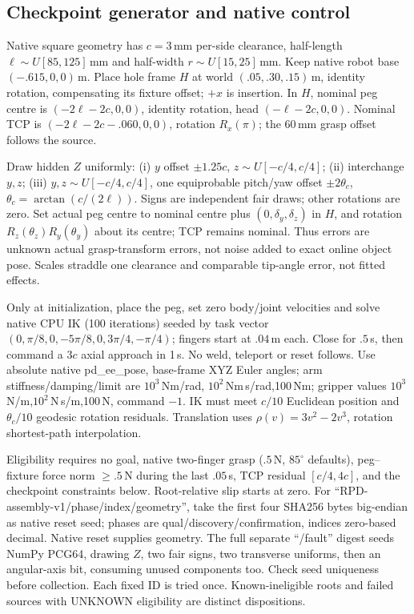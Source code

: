 \subsection{Checkpoint generator and native control}
Native square geometry has $c=3$\,mm per-side clearance, half-length $\ell\sim U[85,125]$\,mm and half-width $r\sim U[15,25]$\,mm. Keep native robot base $(-.615,0,0)$\,m. Place hole frame $H$ at world $(.05,.30,.15)$\,m, identity rotation, compensating its fixture offset; $+x$ is insertion. In $H$, nominal peg centre is $(-2\ell-2c,0,0)$, identity rotation, head $(-\ell-2c,0,0)$. Nominal TCP is $(-2\ell-2c-.060,0,0)$, rotation $R_x(\pi)$; the 60\,mm grasp offset follows the source.

Draw hidden $Z$ uniformly: (i) $y$ offset $\pm1.25c$, $z\sim U[-c/4,c/4]$; (ii) interchange $y,z$; (iii) $y,z\sim U[-c/4,c/4]$, one equiprobable pitch/yaw offset $\pm2\theta_c$, $\theta_c=\arctan(c/(2\ell))$. Signs are independent fair draws; other rotations are zero. Set actual peg centre to nominal centre plus $(0,\delta_y,\delta_z)$ in $H$, and rotation $R_z(\theta_z)R_y(\theta_y)$ about its centre; TCP remains nominal. Thus errors are unknown actual grasp-transform errors, not noise added to exact online object pose. Scales straddle one clearance and comparable tip-angle error, not fitted effects.

Only at initialization, place the peg, set zero body/joint velocities and solve native CPU IK (100 iterations) seeded by task vector $(0,\pi/8,0,-5\pi/8,0,3\pi/4,-\pi/4)$; fingers start at $.04$\,m each. Close for $.5$\,s, then command a $3c$ axial approach in 1\,s. No weld, teleport or reset follows. Use absolute native pd\_ee\_pose, base-frame XYZ Euler angles; arm stiffness/damping/limit are $10^3$\,Nm/rad, $10^2$\,Nm\,s/rad,100\,Nm; gripper values $10^3$\,N/m,$10^2$\,N\,s/m,100\,N, command $-1$. IK must meet $c/10$ Euclidean position and $\theta_c/10$ geodesic rotation residuals. Translation uses $\rho(v)=3v^2-2v^3$, rotation shortest-path interpolation.

Eligibility requires no goal, native two-finger grasp ($.5$\,N, $85^\circ$ defaults), peg--fixture force norm $\ge.5$\,N during the last $.05$\,s, TCP residual $[c/4,4c]$, and the checkpoint constraints below. Root-relative slip starts at zero. For ``RPD-assembly-v1/phase/index/geometry'', take the first four SHA256 bytes big-endian as native reset seed; phases are qual/discovery/confirmation, indices zero-based decimal. Native reset supplies geometry. The full separate ``/fault'' digest seeds NumPy PCG64, drawing $Z$, two fair signs, two transverse uniforms, then an angular-axis bit, consuming unused components too. Check seed uniqueness before collection. Each fixed ID is tried once. Known-ineligible roots and failed sources with UNKNOWN eligibility are distinct dispositions.

